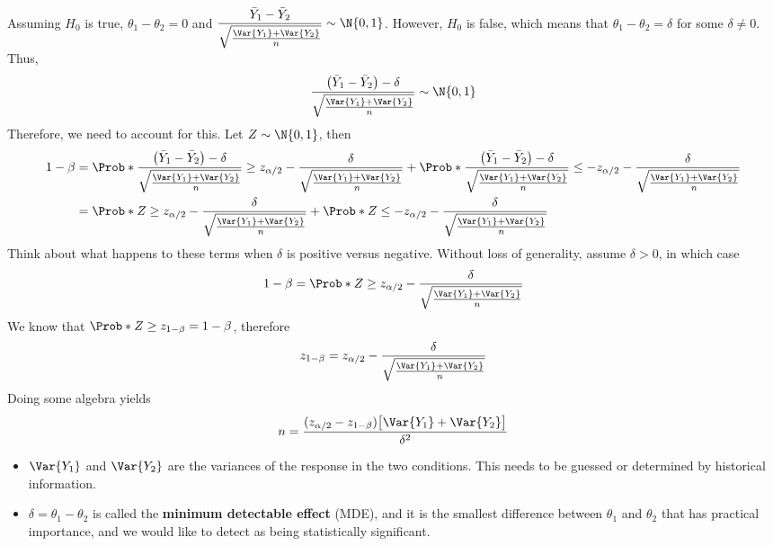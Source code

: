 Assuming $ H_0 $ is true, $ \theta_1-\theta_2=0 $ and $ \displaystyle \frac{\bar{Y}_1-\bar{Y}_2}{\sqrt{\frac{\Var{Y_1}+\Var{Y_2}}{n}}} \sim \N{0,1} $.
However, $ H_0 $ is false, which means that $ \theta_1-\theta_2=\delta $ for some $ \delta\ne 0 $. Thus,
\[ \frac{\bigl(\bar{Y}_1-\bar{Y}_2\bigr)-\delta}{\sqrt{\frac{\Var{Y_1}+\Var{Y_2}}{n}}}\sim \N{0,1}  \]
Therefore, we need to account for this. Let $ Z \sim \N{0,1} $, then
\begin{align*}
      1-\beta
       & =\Prob*{\frac{\bigl(\bar{Y}_1-\bar{Y}_2\bigr)-\delta}{\sqrt{\frac{\Var{Y_1}+\Var{Y_2}}{n}}}\ge z_{\alpha/2}-\frac{\delta}{\sqrt{\frac{\Var{Y_1}+\Var{Y_2}}{n}}}}+\Prob*{\frac{\bigl(\bar{Y}_1-\bar{Y}_2\bigr)-\delta}{\sqrt{\frac{\Var{Y_1}+\Var{Y_2}}{n}}}\le -z_{\alpha/2}-\frac{\delta}{\sqrt{\frac{\Var{Y_1}+\Var{Y_2}}{n}}}} \\
       & =\Prob*{Z\ge z_{\alpha/2}-\frac{\delta}{\sqrt{\frac{\Var{Y_1}+\Var{Y_2}}{n}}}}+\Prob*{Z\le -z_{\alpha/2}-\frac{\delta}{\sqrt{\frac{\Var{Y_1}+\Var{Y_2}}{n}}}}
\end{align*}
Think about what happens to these terms when $ \delta $ is positive versus negative.
Without loss of generality, assume $ \delta>0 $, in which case
\[ 1-\beta=\Prob*{Z\ge z_{\alpha/2}-\frac{\delta}{\sqrt{\frac{\Var{Y_1}+\Var{Y_2}}{n}}}} \]
We know that $ \Prob*{Z\ge z_{1-\beta}}=1-\beta $, therefore
\[ z_{1-\beta}=z_{\alpha/2}-\frac{\delta}{\sqrt{\frac{\Var{Y_1}+\Var{Y_2}}{n}}} \]
Doing some algebra yields
\[ n=\frac{(z_{\alpha/2}-z_{1-\beta})\bigl[\Var{Y_1}+\Var{Y_2}\bigr]}{\delta^2}  \]
\begin{itemize}
      \item $ \Var{Y_1} $ and $ \Var{Y_2} $ are the variances of the response in the two conditions.
            This needs to be guessed or determined by historical information.
      \item $ \delta=\theta_1-\theta_2 $ is called the \textbf{minimum detectable effect} (MDE), and it
            is the smallest difference between $ \theta_1 $ and $ \theta_2 $ that has practical importance,
            and we would like to detect as being statistically significant.
\end{itemize}
